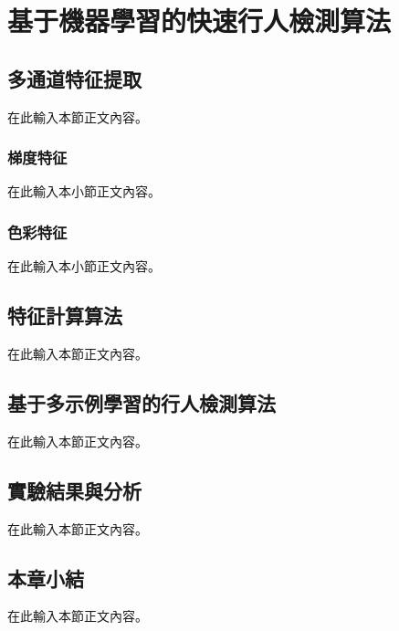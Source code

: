 \chapter{基于機器學習的快速行人檢測算法}

\section{多通道特征提取}
在此輸入本節正文內容。

\subsection{梯度特征}
在此輸入本小節正文內容。

\subsection{色彩特征}
在此輸入本小節正文內容。

\section{特征計算算法}
在此輸入本節正文內容。

\section{基于多示例學習的行人檢測算法}
在此輸入本節正文內容。

\section{實驗結果與分析}
在此輸入本節正文內容。

\section{本章小結}
在此輸入本節正文內容。
